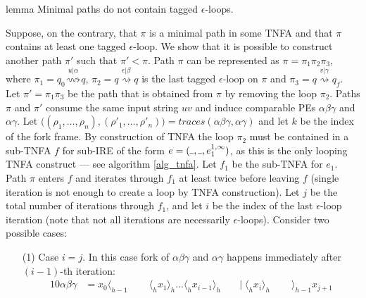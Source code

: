\documentclass[AMA,STIX1COL]{WileyNJD-v2}
\newcommand{\Xl}{\langle}
\newcommand{\Xr}{\rangle}
\newcommand{\Xund}{\rule{.4em}{.4pt}}
\begin{document}
\begin{theoremEnd}[restate, no link to proof, no link to theorem, category=lemmata_closure]{lemma}
    \label{lemma_closure_minpaths}
    Minimal paths do not contain tagged $\epsilon$-loops.
\end{theoremEnd}
\begin{proofEnd}
    Suppose, on the contrary, that $\pi$ is a minimal path in some TNFA
    and that $\pi$ contains at least one tagged $\epsilon$-loop.
    We show that it is possible to construct another path $\pi'$ such that $\pi' < \pi$.
    Path $\pi$ can be represented as
    $\pi = \pi_1 \pi_2 \pi_3$, where
    $\pi_1 = q_0 \overset {u | \alpha} {\rightsquigarrow} q$,
    $\pi_2 = q \overset {\epsilon | \beta} {\rightsquigarrow} q$ is the last tagged $\epsilon$-loop on $\pi$ and
    $\pi_3 = q \overset {v | \gamma} {\rightsquigarrow} q_f$.
    Let $\pi' = \pi_1 \pi_3$ be the path that is obtained from $\pi$ by removing the loop $\pi_2$.
    Paths $\pi$ and $\pi'$ consume the same input string $uv$
    and induce comparable PEs $\alpha \beta \gamma$ and $\alpha \gamma$.
    Let $\big( (\rho_1, \hdots, \rho_n), (\rho'_1, \hdots, \rho'_n) \big) = traces (\alpha \beta \gamma, \alpha \gamma)$
    and let $k$ be the index of the fork frame.
    By construction of TNFA the loop $\pi_2$ must be contained in a sub-TNFA $f$
    for sub-IRE of the form $e = (\Xund, \Xund, e_1^{1,\infty})$,
    as this is the only looping TNFA construct --- see algorithm \ref{alg_tnfa}.
    Let $f_1$ be the sub-TNFA for $e_1$.
    Path $\pi$ enters $f$ and iterates through $f_1$ at least twice before leaving $f$
    (single iteration is not enough to create a loop by TNFA construction).
    Let $j$ be the total number of iterations through $f_1$,
    and let $i$ be the index of the last $\epsilon$-loop iteration
    (note that not all iterations are necessarily $\epsilon$-loops).
    Consider two possible cases:
    \begin{enumerate}[itemsep=0.5em, topsep=0.5em]
    \item[(1)]
        Case $i = j$.
        In this case fork of $\alpha \beta \gamma$ and $\alpha \gamma$ happens immediately after $(i-1)$-th iteration:
        \begin{alignat*}{10}
            \alpha \beta \gamma &= x_0 \Xl_{h-1} \;&&\; \Xl_h x_1 \Xr_h \hdots \Xl_h x_{i-1} \Xr_h \;&&\big|\; \Xl_h x_{i} \Xr_h \;&&\; \Xr_{h-1} x_{j+1} \\[-0.5em]

\end{alignat*}
\end{enumerate}
\end{proofEnd}
\end{document}
